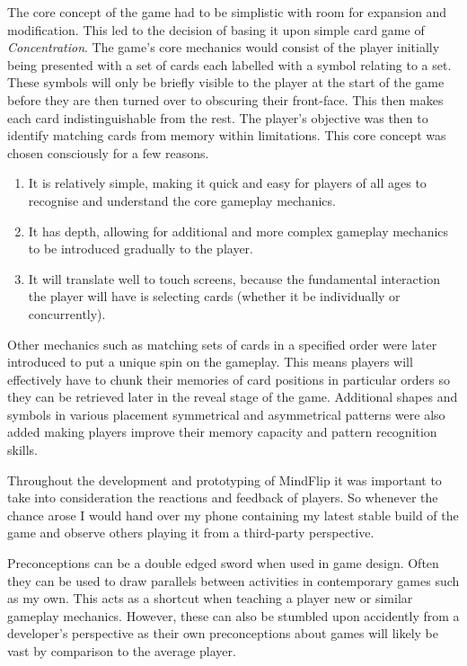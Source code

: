 \documentclass[final]{cmpreport}
\begin{document}
The core concept of the game had to be simplistic with room for expansion and modification. This led to the decision of basing it upon simple card game of \textit{Concentration\footnotemark}. The game's core mechanics would consist of the player initially being presented with a set of cards each labelled with a symbol relating to a set. These symbols will only be briefly visible to the player at the start of the game before they are then turned over to obscuring their front-face. This then makes each card indistinguishable from the rest. The player's objective was then to identify matching cards from memory within limitations. This core concept was chosen consciously for a few reasons.


\begin{enumerate}
  \item It is relatively simple, making it quick and easy for players of all ages to recognise and understand the core gameplay mechanics.
  \item It has depth, allowing for additional and more complex gameplay mechanics to be introduced gradually to the player.
  \item It will translate well to touch screens, because the fundamental interaction the player will have is selecting cards (whether it be individually or concurrently).
\end{enumerate}

Other mechanics such as matching sets of cards in a specified order were later introduced to put a unique spin on the gameplay. This means players will effectively have to chunk their memories of card positions in particular orders so they can be retrieved later in the reveal stage of the game. Additional shapes and symbols in various placement symmetrical and asymmetrical patterns were also added making players improve their memory capacity and pattern recognition skills.

Throughout the development and prototyping of MindFlip it was important to take into consideration the reactions and feedback of players. So whenever the chance arose I would hand over my phone containing my latest stable build of the game and observe others playing it from a third-party perspective.

Preconceptions can be a double edged sword when used in game design. Often they can be used to draw parallels between activities in contemporary games such as my own. This acts as a shortcut when teaching a player new or similar gameplay mechanics. However, these can also be stumbled upon accidently from a developer's perspective as their own preconceptions about games will likely be vast by comparison to the average player.
\end{document}
